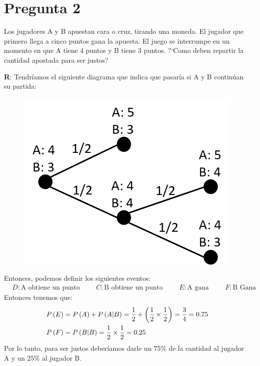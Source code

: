 
\section*{Pregunta 2}

Los jugadores A y B apuestan cara o cruz, tirando una moneda. El jugador que primero llega a cinco puntos gana la apuesta. El juego se interrumpe en un momento en que A tiene 4 puntos y B tiene 3 puntos. ?`Como deben repartir la cantidad apostada para ser justos?

\vspace{0.40cm}
\textbf{R}: Tendríamos el siguiente diagrama que indica que pasaría si A y B continúan su partida:

\begin{figure}[H]
	\centering
	\includegraphics[scale=1]{img/imagen1.png}
\end{figure}

Entonces, podemos definir los siguientes eventos:
\begin{align*}
	& D: \text{A obtiene un punto} \hspace{1cm} C: \text{B obtiene un punto} \hspace{1cm} E: \text{A gana} \hspace{1cm} F: \text{B Gana}
\end{align*}
Entonces tenemos que:
\begin{align*}
	& {P} \left( {E} \right) = {P} \left( {A} \right) + {P} \left( {A | B} \right) = 
	\frac{1}{2} + \left( \frac{1}{2} \times \frac{1}{2} \right) = \frac{3}{4}
	= 0.75 \\
	& {P} \left( {F} \right) = {P} \left( {B | B} \right) = \frac{1}{2} \times \frac{1}{2}
	= 0.25
\end{align*}
Por lo tanto, para ser justos deberíamos darle un $75\%$ de la cantidad al jugador A y un $25\%$ al jugador B.


